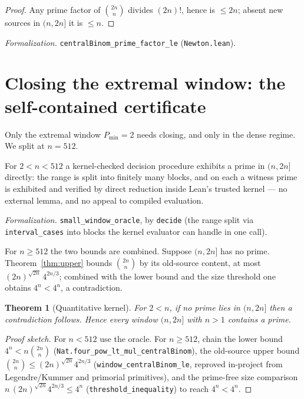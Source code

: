 \documentclass[11pt,a4paper]{amsart}
\theoremstyle{plain}
\newtheorem{theorem}{Theorem}[section]
\theoremstyle{definition}
\theoremstyle{plain}
\theoremstyle{remark}
\newcommand{\lean}[1]{\textup{\texttt{#1}}}
\newcommand{\Formal}[1]{\par\smallskip\noindent\emph{Formalization.} #1\par\smallskip}
\begin{document}
\begin{proof}
Any prime factor of $\binom{2n}{n}$ divides $(2n)!$, hence is $\le 2n$; absent new sources
in $(n,2n]$ it is $\le n$.
\end{proof}

\Formal{\lean{centralBinom\_prime\_factor\_le} (\lean{Newton.lean}).}

\section{Closing the extremal window: the self-contained certificate}
\label{sec:erdos}

Only the extremal window $P_{\min}=2$ needs closing, and only in the dense regime. We
split at $n=512$.

For $2<n<512$ a kernel-checked decision procedure exhibits a prime in $(n,2n]$ directly: the
range is split into finitely many blocks, and on each a witness prime is exhibited and
verified by direct reduction inside Lean's trusted kernel --- no external lemma, and no
appeal to compiled evaluation.

\Formal{\lean{small\_window\_oracle}, by \lean{decide} (the range split via
\lean{interval\_cases} into blocks the kernel evaluator can handle in one call).}

For $n\ge512$ the two bounds are combined. Suppose $(n,2n]$ has no prime.
Theorem~\ref{thm:upper} bounds $\binom{2n}{n}$ by its old-source content, at most
$(2n)^{\sqrt{2n}}\,4^{2n/3}$; combined with the lower bound and the size threshold one
obtains $4^n<4^n$, a contradiction.

\begin{theorem}[Quantitative kernel]\label{thm:erdos}
For $2<n$, if no prime lies in $(n,2n]$ then a contradiction follows. Hence every window
$(n,2n]$ with $n>1$ contains a prime.
\end{theorem}

\begin{proof}[Proof sketch]
For $n<512$ use the oracle. For $n\ge512$, chain the lower bound
$4^n<n\binom{2n}{n}$ (\lean{Nat.four\_pow\_lt\_mul\_centralBinom}), the old-source upper
bound $\binom{2n}{n}\le(2n)^{\sqrt{2n}}4^{2n/3}$ (\lean{window\_centralBinom\_le}, reproved
in-project from Legendre/Kummer and primorial primitives), and the prime-free size
comparison $n\,(2n)^{\sqrt{2n}}4^{2n/3}\le4^n$ (\lean{threshold\_inequality}) to reach
$4^n<4^n$.
\end{proof}
\end{document}
